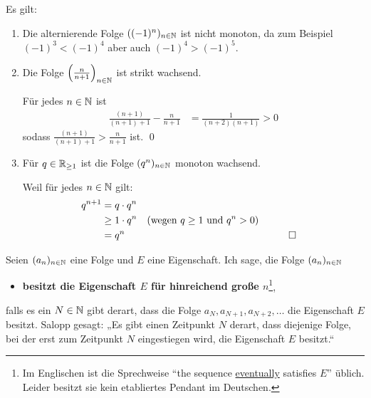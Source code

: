 \begin{bsp}
Es gilt:
    \begin{enumerate}
        \item Die alternierende Folge $((-1)^n)_{n\in \mathbb N}$ ist nicht monoton, da zum Beispiel $(-1)^3< (-1)^4$ aber auch $(-1)^4>(-1)^5$.
        \item Die Folge $\left(\frac{n}{n+1}\right)_{n\in \mathbb N}$ ist strikt wachsend.
        \begin{bew}
            Für jedes $n\in \mathbb N$ ist
            \begin{align*}
                \frac{(n+1)}{(n+1)+1} - \frac{n}{n+1} & = \frac{1}{(n+2)(n+1)} >0
            \end{align*}
            sodass $\frac{(n+1)}{(n+1)+1} > \frac{n}{n+1}$ ist. \qed
        \end{bew}
        \item Für $q\in \mathbb R_{\ge 1}$ ist die Folge $(q^n)_{n\in \mathbb N}$ monoton wachsend.
        \begin{bew}
            Weil für jedes $n\in \mathbb N$ gilt:
            \begin{align*}
                q^{n+1} & = q \cdot q^n \\
                & \ge 1 \cdot q^n && (\text{wegen $q\ge 1$ und $q^n>0$})\\
                & = q^n &&&& \qed
            \end{align*}
        \end{bew}
    \end{enumerate}
\end{bsp}


\begin{de}[``eventually''] \label{def:eventually} 
    Seien $(a_n)_{n\in \mathbb N}$ eine Folge und $E$ eine Eigenschaft. Ich sage, die Folge $(a_n)_{n\in \mathbb N}$
    \begin{itemize}
        \item[] \textbf{besitzt die Eigenschaft $E$ für hinreichend große $n$}\footnote{Im Englischen ist die Sprechweise ``the sequence \href{https://en.wikipedia.org/wiki/Eventually_(mathematics)}{eventually} satisfies $E$'' üblich. Leider besitzt sie kein etabliertes Pendant im Deutschen.},
    \end{itemize}
    falls es ein $N\in \mathbb N$ gibt derart, dass die Folge $a_N,a_{N+1},a_{N+2},\dots$ die Eigenschaft $E$ besitzt. Salopp gesagt: „Es gibt einen Zeitpunkt $N$ derart, dass diejenige Folge, bei der erst zum Zeitpunkt $N$ eingestiegen wird, die Eigenschaft $E$ besitzt.“
\end{de}


